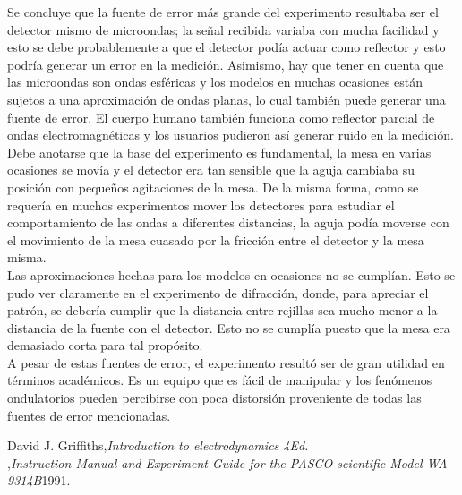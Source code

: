 \documentclass[%
 reprint,
 amsmath,amssymb,
 aps,
]{revtex4-1}
\begin{document}
Se concluye que la fuente de error más grande del experimento resultaba ser el detector mismo de microondas; la señal recibida variaba con mucha facilidad y esto se debe probablemente a que el detector podía actuar como reflector y esto podría generar un error en la medición. Asimismo, hay que tener en cuenta que las microondas son ondas esféricas y los modelos en muchas ocasiones están sujetos a una aproximación de ondas planas, lo cual también puede generar una fuente de error. El cuerpo humano también funciona como reflector parcial de ondas electromagnéticas y los usuarios pudieron así generar ruido en la medición. \\

Debe anotarse que la base del experimento es fundamental, la mesa en varias ocasiones se movía y el detector era tan sensible que la aguja cambiaba su posición con pequeños agitaciones de la mesa. De la misma forma, como se requería en muchos experimentos mover los detectores para estudiar el comportamiento de las ondas a diferentes distancias, la aguja podía moverse con el movimiento de la mesa cuasado por la fricción entre el detector y la mesa misma. \\

Las aproximaciones hechas para los modelos en ocasiones no se cumplían. Esto se pudo ver claramente en el experimento de difracción, donde, para apreciar el patrón, se debería cumplir que la distancia entre rejillas sea mucho menor a la distancia de la fuente con el detector. Esto no se cumplía puesto que la mesa era demasiado corta para tal propósito.\\

A pesar de estas fuentes de error, el experimento resultó ser de gran utilidad en términos académicos. Es un equipo que es fácil de manipular y los fenómenos ondulatorios pueden percibirse con poca distorsión proveniente de todas las fuentes de error mencionadas. 
\\



\begin{thebibliography}{99} 
 David J. Griffiths,{\it Introduction to electrodynamics 4Ed.}\\ 
 ,{\it Instruction Manual and Experiment Guide for the PASCO scientific Model WA-9314B}{1991}.\\ 
\end{thebibliography}
\end{document}
